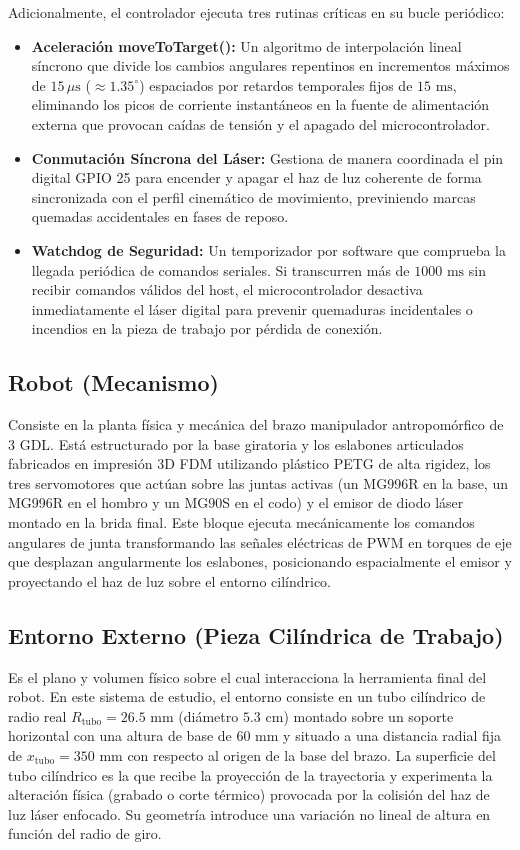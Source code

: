 \documentclass[conference,a4paper]{IEEEtran}
\begin{document}
Adicionalmente, el controlador ejecuta tres rutinas críticas en su bucle periódico:
\begin{itemize}
    \item \textbf{Aceleración moveToTarget():} Un algoritmo de interpolación lineal síncrono que divide los cambios angulares repentinos en incrementos máximos de $15\,\mu\text{s}$ ($\approx 1.35^\circ$) espaciados por retardos temporales fijos de $15\text{ ms}$, eliminando los picos de corriente instantáneos en la fuente de alimentación externa que provocan caídas de tensión y el apagado del microcontrolador.
    \item \textbf{Conmutación Síncrona del Láser:} Gestiona de manera coordinada el pin digital GPIO 25 para encender y apagar el haz de luz coherente de forma sincronizada con el perfil cinemático de movimiento, previniendo marcas quemadas accidentales en fases de reposo.
    \item \textbf{Watchdog de Seguridad:} Un temporizador por software que comprueba la llegada periódica de comandos seriales. Si transcurren más de $1000\text{ ms}$ sin recibir comandos válidos del host, el microcontrolador desactiva inmediatamente el láser digital para prevenir quemaduras incidentales o incendios en la pieza de trabajo por pérdida de conexión.
\end{itemize}

\subsection{Robot (Mecanismo)}
Consiste en la planta física y mecánica del brazo manipulador antropomórfico de 3 GDL. Está estructurado por la base giratoria y los eslabones articulados fabricados en impresión 3D FDM utilizando plástico PETG de alta rigidez, los tres servomotores que actúan sobre las juntas activas (un MG996R en la base, un MG996R en el hombro y un MG90S en el codo) y el emisor de diodo láser montado en la brida final. Este bloque ejecuta mecánicamente los comandos angulares de junta transformando las señales eléctricas de PWM en torques de eje que desplazan angularmente los eslabones, posicionando espacialmente el emisor y proyectando el haz de luz sobre el entorno cilíndrico.

\subsection{Entorno Externo (Pieza Cilíndrica de Trabajo)}
Es el plano y volumen físico sobre el cual interacciona la herramienta final del robot. En este sistema de estudio, el entorno consiste en un tubo cilíndrico de radio real $R_{\text{tubo}} = 26.5\text{ mm}$ (diámetro $5.3\text{ cm}$) montado sobre un soporte horizontal con una altura de base de $60\text{ mm}$ y situado a una distancia radial fija de $x_{\text{tubo}} = 350\text{ mm}$ con respecto al origen de la base del brazo. La superficie del tubo cilíndrico es la que recibe la proyección de la trayectoria y experimenta la alteración física (grabado o corte térmico) provocada por la colisión del haz de luz láser enfocado. Su geometría introduce una variación no lineal de altura en función del radio de giro.
\end{document}
